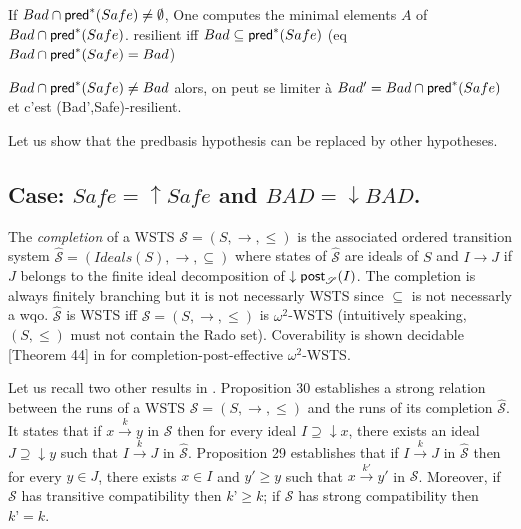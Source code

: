 
If $Bad \cap \textsf{pred}^*(Safe) \neq \emptyset$, One computes the minimal elements $A$ of $Bad \cap \textsf{pred}^*(Safe)$.
resilient iff $Bad \subseteq \textsf{pred}^*(Safe)$  (eq $Bad \cap \textsf{pred}^*(Safe) = Bad$)

$Bad \cap \textsf{pred}^*(Safe) \neq Bad$ alors, on peut se limiter à $Bad' = Bad \cap \textsf{pred}^*(Safe)$ et c'est (Bad',Safe)-resilient.

Let us show that the predbasis hypothesis can be replaced by other hypotheses.

\subsection{Case: $Safe=\uparrow Safe$ and $BAD=\downarrow BAD$.}

%
%




The \emph{completion}  \cite{BFM-ic17} of a WSTS $\mathscr{S}=(S,\rightarrow, \leq)$ is the associated ordered transition system $\hat{\mathscr{S}}=(Ideals(S),\rightarrow, \subseteq)$ where states of $\hat{\mathscr{S}}$ are ideals of $S$ and $I \rightarrow J$ if $J$ belongs to the finite ideal decomposition of $\downarrow \textsf{post}_{\mathscr{S}}(I)$. The completion is always finitely branching but it is not necessarly WSTS since $\subseteq$ is not necessarly a wqo. $\hat{\mathscr{S}}$ is WSTS iff $\mathscr{S}=(S,\rightarrow, \leq)$ is $\omega^2$-WSTS (intuitively speaking, $(S,\leq)$ must not contain the Rado set). Coverability is shown decidable  [Theorem 44] in \cite{BFM-ic17} for completion-post-effective $\omega^2$-WSTS.

Let us recall two other results in \cite{BFM-ic17}. Proposition 30 establishes a strong relation between the runs of a WSTS $\mathscr{S}=(S,\rightarrow, \leq)$ and the runs of its completion $\hat{\mathscr{S}}$. It states that if $x \xrightarrow{k} y$ in $\mathscr{S}$ then for every ideal $I \supseteq \downarrow x$, there exists an ideal $J \supseteq \downarrow y$ such that $I \xrightarrow{k} J$ in $\hat{\mathscr{S}}$. Proposition 29 establishes that if $I \xrightarrow{k} J$ in $\hat{\mathscr{S}}$ then for every $y \in J$, there exists $x \in I$ and $y' \geq y$ such that $x \xrightarrow{k'} y'$ in $\mathscr{S}$. Moreover, if $\mathscr{S}$ has transitive compatibility then $k’ \geq k$; if $\mathscr{S}$ has strong compatibility then $k’ = k$.


